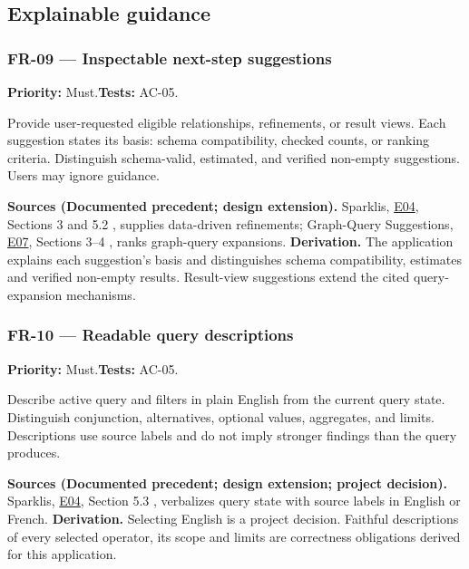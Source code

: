 \documentclass[11pt,a4paper]{article}
\newcommand{\req}[4]{\subsubsection*{#1 --- #2}\phantomsection\label{req:#1}\textbf{Priority:} #3.\quad\textbf{Tests:} #4.\par}
\newcommand{\origin}[3]{\par{\small\textbf{Sources (#1).} #2 \textbf{Derivation.} #3\par}}
\newcommand{\evidence}[1]{\hyperlink{evidence:#1}{#1}}
\begin{document}
\subsection{Explainable guidance}
\par\noindent\begin{minipage}{\linewidth}
\req{FR-09}{Inspectable next-step suggestions}{Must}{AC-05}
Provide user-requested eligible relationships, refinements, or result views. Each suggestion states its basis: schema compatibility, checked counts, or ranking criteria. Distinguish schema-valid, estimated, and verified non-empty suggestions. Users may ignore guidance.
\origin{Documented precedent; design extension}{Sparklis, \evidence{E04}, Sections 3 and 5.2 \citep{sparklis}, supplies data-driven refinements; Graph-Query Suggestions, \evidence{E07}, Sections 3--4 \citep{suggestions}, ranks graph-query expansions.}{The application explains each suggestion's basis and distinguishes schema compatibility, estimates and verified non-empty results. Result-view suggestions extend the cited query-expansion mechanisms.}
\end{minipage}\par
\par\noindent\begin{minipage}{\linewidth}
\req{FR-10}{Readable query descriptions}{Must}{AC-05}
Describe active query and filters in plain English from the current query state. Distinguish conjunction, alternatives, optional values, aggregates, and limits. Descriptions use source labels and do not imply stronger findings than the query produces.
\origin{Documented precedent; design extension; project decision}{Sparklis, \evidence{E04}, Section 5.3 \citep{sparklis}, verbalizes query state with source labels in English or French.}{Selecting English is a project decision. Faithful descriptions of every selected operator, its scope and limits are correctness obligations derived for this application.}
\end{minipage}\par
\end{document}
